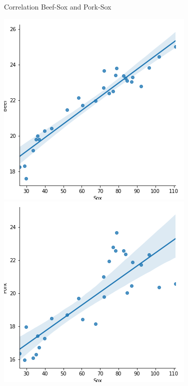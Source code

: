 \documentclass[t,9pt,aspectratio=169]{beamer}
\begin{document}
\begin{frame}{Correlation Beef-Sox and Pork-Sox}
\begin{center}
\includegraphics[scale=0.4 ]{./figures/Sox_Beef} \includegraphics[scale=0.4]{./figures/Sox_Pork} 
\end{center}
\end{frame}
\end{document}
